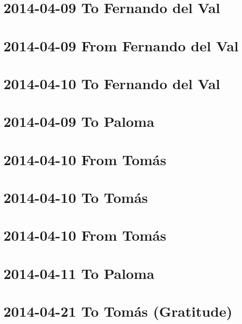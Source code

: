 \documentclass[]{book}
\begin{document}
\hypertarget{to-fernando-del-val-2}{%
\section{2014-04-09 To Fernando del Val}\label{to-fernando-del-val-2}}

\hypertarget{from-fernando-del-val-3}{%
\section{2014-04-09 From Fernando del Val}\label{from-fernando-del-val-3}}

\hypertarget{to-fernando-del-val-3}{%
\section{2014-04-10 To Fernando del Val}\label{to-fernando-del-val-3}}

\hypertarget{to-paloma-2}{%
\section{2014-04-09 To Paloma}\label{to-paloma-2}}

\hypertarget{from-tomas-3}{%
\section{2014-04-10 From Tomás}\label{from-tomas-3}}

\hypertarget{to-tomas-7}{%
\section{2014-04-10 To Tomás}\label{to-tomas-7}}

\hypertarget{from-tomas-4}{%
\section{2014-04-10 From Tomás}\label{from-tomas-4}}

\hypertarget{to-paloma-3}{%
\section{2014-04-11 To Paloma}\label{to-paloma-3}}

\hypertarget{to-tomas-gratitude}{%
\section{2014-04-21 To Tomás (Gratitude)}\label{to-tomas-gratitude}}
\end{document}
